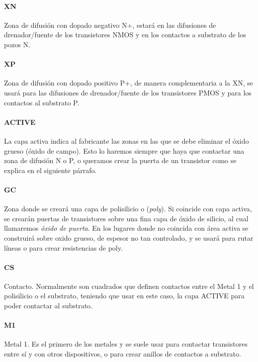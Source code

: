 \paragraph{XN}
Zona de difusión con dopado negativo N+, estará en las difusiones de drenador/fuente
de los transistores NMOS y en los contactos a substrato de los pozos N.

\paragraph{XP}
Zona de difusión con dopado positivo P+, de manera complementaria a la XN,
se usará para las difusiones de drenador/fuente
de los transistores PMOS y para los contactos al substrato P.

\paragraph{ACTIVE}
La capa activa indica al fabricante las zonas en las que se debe eliminar el óxido grueso (óxido
de campo). Esto lo haremos siempre que haya que contactar una zona de difusión N o P,
o queramos crear la puerta de un transistor como se explica en el siguiente párrafo.

\paragraph{GC}
Zona donde se creará una capa de polisilicio o (\textit{poly}). Si coincide con capa activa,
se crearán puertas de transistores sobre una fina capa de óxido de silicio,
al cual llamaremos \textit{óxido de puerta}.
En los lugares donde no coincida con área activa se construirá sobre oxido grueso,
de espesor no tan controlado, y se usará para rutar líneas o para crear resistencias
de poly.

\paragraph{CS}
Contacto. Normalmente son cuadrados que definen contactos entre el Metal 1 y el
polisilicio o el substrato, teniendo que usar en este caso, la capa ACTIVE para
poder contactar al substrato.

\paragraph{M1}
Metal 1. Es el primero de los metales y se suele usar para contactar
transistores entre sí y con otros dispositivos, o para crear anillos de contactos
a substrato.

